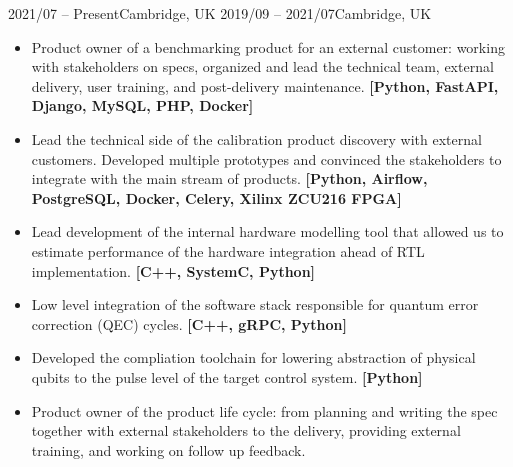 \documentclass[10pt,a4paper,ragged2e,withhyper]{altacv}
\begin{document}
\begin{paracol}{2}


{2021/07 -- Present}{Cambridge, UK}
{2019/09 -- 2021/07}{Cambridge, UK}


\begin{itemize}

    \item
    Product owner of a benchmarking product for an external customer:
    working with stakeholders on specs, organized and lead the technical team,
    external delivery, user training, and post-delivery maintenance.
    {\bf [Python, FastAPI, Django, MySQL, PHP, Docker]}
    
    \item
    Lead the technical side of the calibration product discovery with external
    customers.
    Developed multiple prototypes and convinced the stakeholders to integrate
    with the main stream of products.
    {\bf [Python, Airflow, PostgreSQL, Docker, Celery, Xilinx ZCU216 FPGA]}
    
    \item
    Lead development of the internal hardware modelling tool that allowed us
    to estimate performance of the hardware integration ahead of RTL
    implementation.
    {\bf [C++, SystemC, Python]}

    \item
    Low level integration of the software stack responsible for quantum error
    correction (QEC) cycles.
    {\bf [C++, gRPC, Python]}
    
    \item
    Developed the compliation toolchain for lowering abstraction of physical
    qubits to the pulse level of the target control system.
    {\bf [Python]}
    
    \item
    Product owner of the product life cycle: from planning
    and writing the spec together with external stakeholders to the delivery,
    providing external training, and working on follow up feedback.
    

\end{itemize}
\end{paracol}
\end{document}
